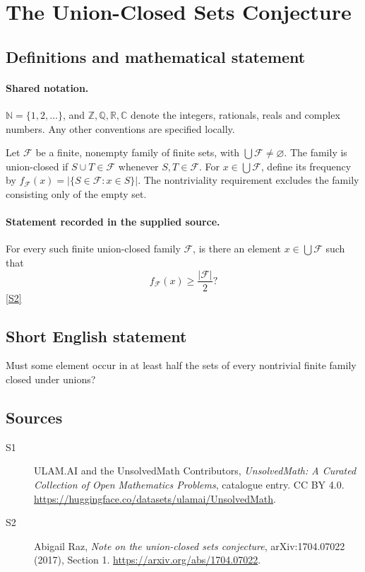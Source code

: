 \documentclass[11pt]{article}
\newcommand{\sref}[2]{\hyperlink{source:#1:#2}{[S#2]}}
\begin{document}
\section{The Union-Closed Sets Conjecture}\label{statement}

\subsection{Definitions and mathematical statement}

\paragraph{Shared notation.}$\mathbb N=\{1,2,\ldots\}$, and $\mathbb Z,\mathbb Q,\mathbb R,\mathbb C$ denote the integers, rationals, reals and complex numbers. Any other conventions are specified locally.


Let \(\mathcal F\) be a finite, nonempty family of finite sets,
with \(\bigcup\mathcal F\ne\varnothing\).
The family is union-closed if \(S\cup T\in\mathcal F\) whenever
\(S,T\in\mathcal F\).  For \(x\in\bigcup\mathcal F\), define its frequency
by \(f_{\mathcal F}(x)=|\{S\in\mathcal F:x\in S\}|\).
The nontriviality requirement excludes the family consisting only of
the empty set.
\paragraph{Statement recorded in the supplied source.}
For every such finite union-closed family \(\mathcal F\), is there
an element \(x\in\bigcup\mathcal F\) such that
\[
 f_{\mathcal F}(x)\ge\frac{|\mathcal F|}{2}?
\] \sref{statement}{2}
\subsection{Short English statement}
Must some element occur in at least half the sets of every nontrivial finite family closed under unions?
\subsection{Sources}
\begin{description}
\item[\hypertarget{source:statement:1}{S1}] ULAM.AI and the UnsolvedMath Contributors, \emph{UnsolvedMath: A Curated Collection of Open Mathematics Problems}, catalogue entry. CC BY 4.0. \url{https://huggingface.co/datasets/ulamai/UnsolvedMath}.
\item[\hypertarget{source:statement:2}{S2}] Abigail Raz, \emph{Note on the union-closed sets conjecture}, arXiv:1704.07022 (2017), Section 1. \url{https://arxiv.org/abs/1704.07022}.
\end{description}
\label{end:statement}
\end{document}
